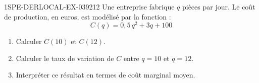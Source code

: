\begin{exercice}{1SPE-DERLOCAL-EX-039}{2}{12}
Une entreprise fabrique $q$ pièces par jour. Le coût de production, en euros, est modélisé par la fonction :
\[
C(q) = 0{,}5\,q^2 + 3q + 100
\]
\begin{enumerate}
\item Calculer $C(10)$ et $C(12)$.
\item Calculer le taux de variation de $C$ entre $q = 10$ et $q = 12$.
\item Interpréter ce résultat en termes de coût marginal moyen.
\end{enumerate}
\end{exercice}
